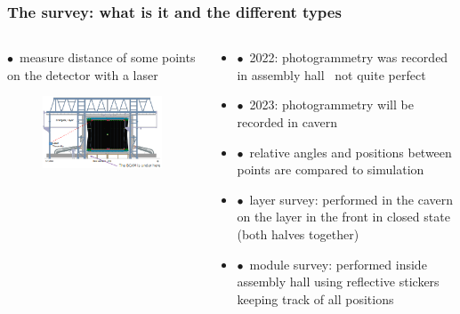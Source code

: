 \documentclass[aspectratio=1610, 12pt, xcolor=dvipsnames]{beamer}
\begin{document}
\begin{frame}\frametitle{The survey: what is it and the different types}
  \begin{columns}
    \begin{column}[c]{0.48\textwidth}
      $\bullet$\, measure distance of some points on the detector with a laser
      \begin{figure}
        \centering
        \includegraphics[width=\textwidth]{logos/survey.png}
      \end{figure}
    \end{column}
    \begin{column}[c]{0.48\textwidth}
      \begin{itemize}
        \item $\bullet$\, 2022: photogrammetry was recorded in assembly hall \to\, not quite perfect
        \item $\bullet$\, 2023: photogrammetry will be recorded in cavern
        \item $\bullet$\, relative angles and positions between points are compared to simulation
        \item $\bullet$\, layer survey: performed in the cavern on the layer in  the front in closed state (both halves together)
        \item $\bullet$\, module survey: performed inside assembly hall using reflective stickers keeping track of all positions
      \end{itemize}
    \end{column}
  \end{columns}
\end{frame}
\end{document}
